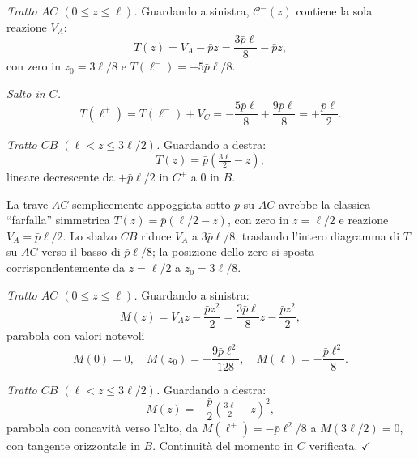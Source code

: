 \begin{esempio}
\begin{svolgimento}
		\textit{Tratto $AC$ $(0 \leq z \leq \ell)$.}
		Guardando a sinistra, $\mathcal{C}^-(z)$ contiene
		la sola reazione $V_A$:
		\[
		T(z) = V_A - \bar p z
		= \frac{3\bar p\ell}{8} - \bar p z,
		\]
		con zero in $z_0 = 3\ell/8$ e $T(\ell^-) =
		-5\bar p\ell/8$.
		
		\textit{Salto in $C$.}
		\[
		T(\ell^+) = T(\ell^-) + V_C
		= -\frac{5\bar p\ell}{8} + \frac{9\bar p\ell}{8}
		= +\frac{\bar p\ell}{2}.
		\]
		
		\textit{Tratto $CB$ $(\ell < z \leq 3\ell/2)$.}
		Guardando a destra:
		\[
		T(z) = \bar p\!\left(\tfrac{3\ell}{2} - z\right),
		\]
		lineare decrescente da $+\bar p\ell/2$ in $C^+$ a
		$0$ in $B$.
		
		La trave $AC$ semplicemente appoggiata sotto $\bar p$
		su $AC$ avrebbe la classica ``farfalla'' simmetrica
		$T(z) = \bar p(\ell/2 - z)$, con zero in $z=\ell/2$
		e reazione $V_A = \bar p\ell/2$. Lo sbalzo $CB$
		riduce $V_A$ a $3\bar p\ell/8$, traslando l'intero
		diagramma di $T$ su $AC$ verso il basso di
		$\bar p\ell/8$; la posizione dello zero si sposta
		corrispondentemente da $z = \ell/2$ a $z_0 = 3\ell/8$.
		



		
		
		
		
		
		
		\textit{Tratto $AC$ $(0 \leq z \leq \ell)$.}
		Guardando a sinistra:
		\[
		M(z) = V_A z - \frac{\bar p z^2}{2}
		= \frac{3\bar p\ell}{8} z - \frac{\bar p z^2}{2},
		\]
		parabola con valori notevoli
		\[
		M(0) = 0, \quad
		M(z_0) = +\frac{9\bar p\ell^2}{128}, \quad
		M(\ell) = -\frac{\bar p\ell^2}{8}.
		\]
		
		\textit{Tratto $CB$ $(\ell < z \leq 3\ell/2)$.}
		Guardando a destra:
		\[
		M(z) = -\frac{\bar p}{2}\!\left(\tfrac{3\ell}{2} - z\right)^2,
		\]
		parabola con concavità verso l'alto, da
		$M(\ell^+) = -\bar p\ell^2/8$ a $M(3\ell/2) = 0$,
		con tangente orizzontale in $B$. Continuità del
		momento in $C$ verificata. $\checkmark$
		

\end{svolgimento}
\end{esempio}
